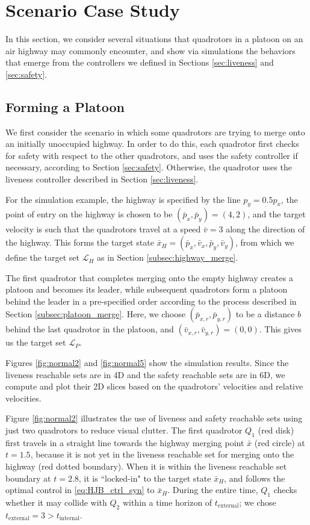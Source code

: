 \section{Scenario Case Study \label{sec:scenarios}}
In this section, we consider several situations that quadrotors in a platoon on an air highway may commonly encounter, and show via simulations the behaviors that emerge from the controllers we defined in Sections \ref{sec:liveness} and \ref{sec:safety}.

\subsection{Forming a Platoon}
We first consider the scenario in which some quadrotors are trying to merge onto an initially unoccupied highway. In order to do this, each quadrotor first checks for safety with respect to the other quadrotors, and uses the safety controller if necessary, according to Section \ref{sec:safety}. Otherwise, the quadrotor uses the liveness controller described in Section \ref{sec:liveness}. 

For the simulation example, the highway is specified by the line $p_y = 0.5p_x$, the point of entry on the highway is chosen to be $(\bar{p}_x, \bar{p}_y) = (4,2)$, and the target velocity is such that the quadrotors travel at a speed $\bar{v}=3$ along the direction of the highway. This forms the target state $\bar{x}_H=(\bar{p}_x, \bar{v}_x, \bar{p}_y, \bar{v}_y)$, from which we define the target set $\mathcal{L}_H$ as in Section \ref{subsec:highway_merge}.

The first quadrotor that completes merging onto the empty highway creates a platoon and becomes its leader, while subsequent quadrotors form a platoon behind the leader in a pre-specified order according to the process described in Section \ref{subsec:platoon_merge}. Here, we choose $(\bar{p}_{x,r}, \bar{p}_{y,r})$ to be a distance $b$ behind the last quadrotor in the platoon, and $(\bar{v}_{x,r}, \bar{v}_{y,r}) = (0,0)$. This gives us the target set $\mathcal{L}_P$.

Figures \ref{fig:normal2} and \ref{fig:normal5} show the simulation results. Since the liveness reachable sets are in 4D and the safety reachable sets are in 6D, we compute and plot their 2D slices based on the quadrotors' velocities and relative velocities. 

Figure \ref{fig:normal2} illustrates the use of liveness and safety reachable sets using just two quadrotors to reduce visual clutter. The first quadrotor $Q_1$ (red disk) first travels in a straight line towards the highway merging point $\bar{x}$ (red circle) at $t=1.5$, because it is not yet in the liveness reachable set for merging onto the highway (red dotted boundary). When it is within the liveness reachable set boundary at $t=2.8$, it is ``locked-in" to the target state $\bar{x}_H$, and follows the optimal control in \eqref{eq:HJB_ctrl_syn} to $\bar{x}_H$. During the entire time, $Q_1$ checks whether it may collide with $Q_2$ within a time horizon of $t_\text{external}$; we chose $t_\text{external}=3>t_\text{internal}$. 

